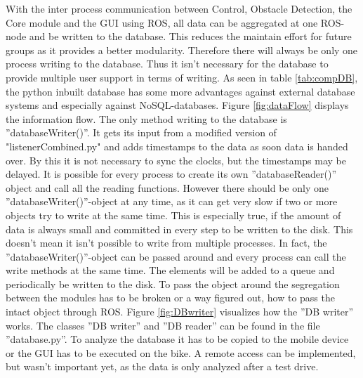 \documentclass[]{scrreprt}
\begin{document}
	With the inter process communication between Control, Obstacle Detection, the Core module and the GUI using ROS, all data can be aggregated at one ROS-node and be written to the database. This reduces the maintain effort for future groups as it provides a better modularity. Therefore there will always be only one process writing to the database. Thus it isn't necessary for the database to provide multiple user support in terms of writing. As seen in table \ref{tab:compDB}, the python inbuilt database has some more advantages against external database systems and especially against NoSQL-databases.
	Figure \ref{fig:dataFlow} displays the information flow. The only method writing to the database is ''databaseWriter()''. It gets its input from a modified version of "listenerCombined.py" and adds timestamps to the data as soon data is handed over. By this it is not necessary to sync the clocks, but the timestamps may be delayed. It is possible for every process to create its own ''databaseReader()'' object and call all the reading functions. However there should be only one ''databaseWriter()''-object at any time, as it can get very slow if two or more objects try to write at the same time. This is especially true, if the amount of data is always small and committed in every step to be written to the disk. This doesn't mean it isn't possible to write from multiple processes. In fact, the ''databaseWriter()''-object can be passed around and every process can call the write methods at the same time. The elements will be added to a queue and periodically be written to the disk. To pass the object around the segregation between the modules has to be broken or a way figured out, how to pass the intact object through ROS. Figure \ref{fig:DBwriter} visualizes how the ''DB writer'' works.
	The classes ''DB writer'' and ''DB reader'' can be found in the file ''database.py''.
	To analyze the database it has to be copied to the mobile device or the GUI has to be executed on the bike. A remote access can be implemented, but wasn't important yet, as the data is only analyzed after a test drive.
	
\end{document}
